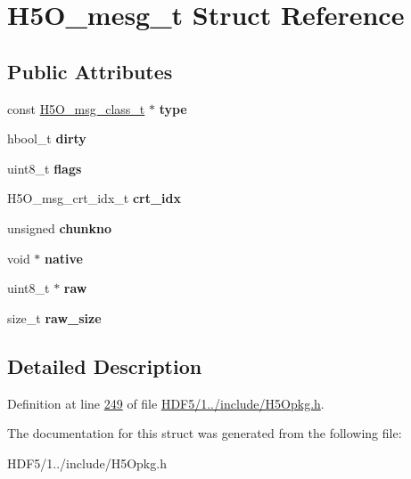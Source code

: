 \hypertarget{struct_h5_o__mesg__t}{}\section{H5\+O\+\_\+mesg\+\_\+t Struct Reference}
\label{struct_h5_o__mesg__t}
\subsection*{Public Attributes}
\begin{DoxyCompactItemize}
\item 
\mbox{\label{struct_h5_o__mesg__t_a89fcaa0714915646bd3c93f670d3ed66}} 
const \hyperlink{struct_h5_o__msg__class__t}{H5\+O\+\_\+msg\+\_\+class\+\_\+t} $\ast$ {\bfseries type}
\item 
\mbox{\label{struct_h5_o__mesg__t_a69b74a50cb8e1d4f34392c7478a2b84e}} 
hbool\+\_\+t {\bfseries dirty}
\item 
\mbox{\label{struct_h5_o__mesg__t_a5ce81655c58a105085d695c2d9fe00a5}} 
uint8\+\_\+t {\bfseries flags}
\item 
\mbox{\label{struct_h5_o__mesg__t_abe52b70e2ff1bdb7d7d44ed4d9d48fef}} 
H5\+O\+\_\+msg\+\_\+crt\+\_\+idx\+\_\+t {\bfseries crt\+\_\+idx}
\item 
\mbox{\label{struct_h5_o__mesg__t_a4c90876c84e48f4f4e564f77e1a2ea21}} 
unsigned {\bfseries chunkno}
\item 
\mbox{\label{struct_h5_o__mesg__t_aaa1e278ee5e1ac48149c30812c454268}} 
void $\ast$ {\bfseries native}
\item 
\mbox{\label{struct_h5_o__mesg__t_a473c7a1d48009643b48dd328da66cc81}} 
uint8\+\_\+t $\ast$ {\bfseries raw}
\item 
\mbox{\label{struct_h5_o__mesg__t_a153eca20c71ddfa65169849cb08d0a95}} 
size\+\_\+t {\bfseries raw\+\_\+size}
\end{DoxyCompactItemize}


\subsection{Detailed Description}


Definition at line \hyperlink{_h_d_f5_21_810_81_2include_2_h5_opkg_8h_source_l00249}{249} of file \hyperlink{_h_d_f5_21_810_81_2include_2_h5_opkg_8h_source}{H\+D\+F5/1../include/\+H5\+Opkg.\+h}.



The documentation for this struct was generated from the following file\+:\begin{DoxyCompactItemize}
\item 
H\+D\+F5/1../include/\+H5\+Opkg.\+h\end{DoxyCompactItemize}
